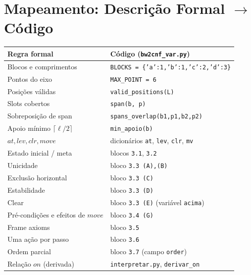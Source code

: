 \documentclass[11pt,a4paper]{article}
\newcommand{\at}{\mathit{at}}
\newcommand{\lev}{\mathit{lev}}
\newcommand{\clr}{\mathit{clr}}
\newcommand{\on}{\mathit{on}}
\newcommand{\mv}{\mathit{move}}
\begin{document}
\section{Mapeamento: Descri\c{c}\~ao Formal $\to$ C\'odigo}
\begin{center}
\small
\begin{tabular}{ll}
\toprule
Regra formal & C\'odigo (\texttt{bw2cnf\_var.py})\\
\midrule
Blocos e comprimentos & \texttt{BLOCKS = \{'a':1,'b':1,'c':2,'d':3\}}\\
Pontos do eixo & \texttt{MAX\_POINT = 6}\\
Posi\c{c}\~oes v\'alidas & \texttt{valid\_positions(L)}\\
Slots cobertos & \texttt{span(b, p)}\\
Sobreposi\c{c}\~ao de span & \texttt{spans\_overlap(b1,p1,b2,p2)}\\
Apoio m\'inimo $\lceil\ell/2\rceil$ & \texttt{min\_apoio(b)}\\
$\at,\lev,\clr,\mv$ & dicion\'arios \texttt{at}, \texttt{lev}, \texttt{clr}, \texttt{mv}\\
Estado inicial / meta & blocos \texttt{3.1}, \texttt{3.2}\\
Unicidade & bloco \texttt{3.3 (A),(B)}\\
Exclus\~ao horizontal & bloco \texttt{3.3 (C)}\\
Estabilidade & bloco \texttt{3.3 (D)}\\
Clear & bloco \texttt{3.3 (E)} (vari\'avel \texttt{acima})\\
Pr\'e-condi\c{c}\~oes e efeitos de $\mv$ & bloco \texttt{3.4 (G)}\\
Frame axioms & bloco \texttt{3.5}\\
Uma a\c{c}\~ao por passo & bloco \texttt{3.6}\\
Ordem parcial & bloco \texttt{3.7} (campo \texttt{order})\\
Rela\c{c}\~ao $\on$ (derivada) & \texttt{interpretar.py}, \texttt{derivar\_on}\\
\bottomrule
\end{tabular}
\end{center}
\end{document}
